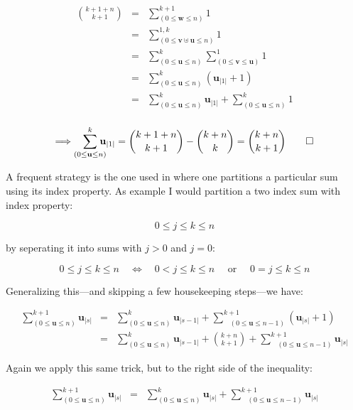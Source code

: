 \documentclass[twoside]{amsart}
\newcommand{\bu}[1][u]{\ensuremath{\mathbf #1}}
\begin{document}
\begin{eqnarray*}
{k+1+n\choose k+1} & = & \sum_{(0\le\bu[w]\le n)}^{k+1}\!\!\!\!\! 1    \\
 & = & \sum_{(0\le\bu[v]\uplus\bu\le n)}^{1,k}\!\!\!\!\!\!\!\! 1       \\
 & = & \sum_{(0\le\bu\le n)}^{k}                                       
       \sum_{(0\le\bu[v]\le\bu)}^1\!\!\!\!\! 1                         \\
 & = & \sum_{(0\le\bu\le n)}^{k}\!\!\!\!\!(\bu_{|1|}+1)                \\
 & = & \sum_{(0\le\bu\le n)}^k\!\!\!\!\! \bu_{|1|}
                               +\sum_{(0\le\bu\le n)}^k\!\!\!\!\! 1    \\      
\end{eqnarray*} 

$$  \Longrightarrow\sum_{(0\le\bu\le n)}^{k}\!\!\!\!\! \bu_{|1|}
     ={k+1+n\choose k+1}-{k+n\choose k}={k+n\choose k+1}\qed  $$

A frequent strategy is the one used in \cite{gkp} where one partitions a particular sum using its index property.
As example I would partition a two index sum with index property:

$$ 0\le j\le k\le n $$

by seperating it into sums with $ j > 0 $ and $ j=0 $:

$$ 0\le j\le k\le n\quad\Longleftrightarrow\quad 0 < j\le k\le n\quad\mbox{ or }\quad 0=j\le k\le n $$

Generalizing this---and skipping a few housekeeping steps---we have:

\begin{eqnarray*}
\sum_{(0\le\bu\le n)}^{k+1}\!\!\!\!\! \bu_{|s|}
 & = & \sum_{(0\le\bu\le n)}^{k}\!\!\!\!\! \bu_{|s-1|}+\!\!\!\!\!\!\!\!\!\!
       \sum_{\ \ \ \ (0\le\bu\le n-1)}^{k+1}
            \!\!\!\!\!\!\!\!\!\!\!\! (\bu_{|s|}+1)                          \\
 & = & \sum_{(0\le\bu\le n)}^{k}\!\!\!\!\! \bu_{|s-1|}+{k+n\choose k+1}
        +\!\!\!\!\!\!\!\!\!\!\!\sum_{\ \ \ \ (0\le\bu\le n-1)}^{k+1}
         \!\!\!\!\!\!\!\!\!\!\!\! \bu_{|s|}                                 
\end{eqnarray*}

Again we apply this same trick, but to the right side of the inequality:

\begin{eqnarray*}
\sum_{(0\le\bu\le n)}^{k+1}\!\!\!\!\! \bu_{|s|}
 & = & \sum_{(0\le\bu\le n)}^{k}\!\!\!\!\! \bu_{|s|}
       +\!\!\!\!\!\!\!\!\!\sum_{\ \ \ \ (0\le\bu\le n-1)}^{k+1}
       \!\!\!\!\!\!\!\!\!\!\!\! \bu_{|s|}                
\end{eqnarray*} 
\end{document}
